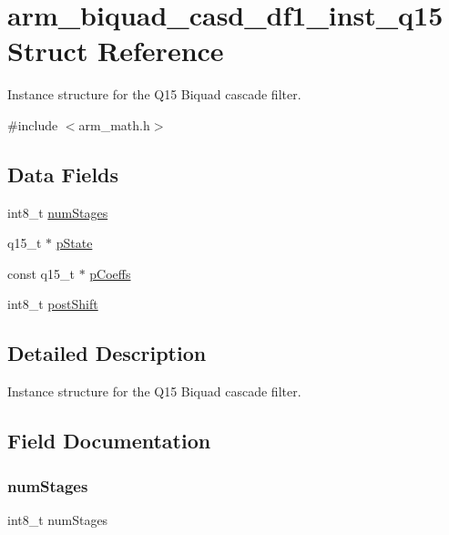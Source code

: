 \hypertarget{structarm__biquad__casd__df1__inst__q15}{}\section{arm\+\_\+biquad\+\_\+casd\+\_\+df1\+\_\+inst\+\_\+q15 Struct Reference}
\label{structarm__biquad__casd__df1__inst__q15}


Instance structure for the Q15 Biquad cascade filter.  




{\ttfamily \#include $<$arm\+\_\+math.\+h$>$}

\subsection*{Data Fields}
\begin{DoxyCompactItemize}
\item 
int8\+\_\+t \mbox{\hyperlink{structarm__biquad__casd__df1__inst__q15_af59c4ceb94f92d6613492b37e7c949de}{num\+Stages}}
\item 
q15\+\_\+t $\ast$ \mbox{\hyperlink{structarm__biquad__casd__df1__inst__q15_ae29dfdb736374fcddaeaec4b7770170c}{p\+State}}
\item 
const q15\+\_\+t $\ast$ \mbox{\hyperlink{structarm__biquad__casd__df1__inst__q15_ae85d417edcdce57e9a54f8c841580578}{p\+Coeffs}}
\item 
int8\+\_\+t \mbox{\hyperlink{structarm__biquad__casd__df1__inst__q15_a3603cbf084938b6931bcb05dfe487f09}{post\+Shift}}
\end{DoxyCompactItemize}


\subsection{Detailed Description}
Instance structure for the Q15 Biquad cascade filter. 

\subsection{Field Documentation}
\mbox{\label{structarm__biquad__casd__df1__inst__q15_af59c4ceb94f92d6613492b37e7c949de}} 
\subsubsection{\texorpdfstring{numStages}{numStages}}
{\footnotesize\ttfamily int8\+\_\+t num\+Stages}

